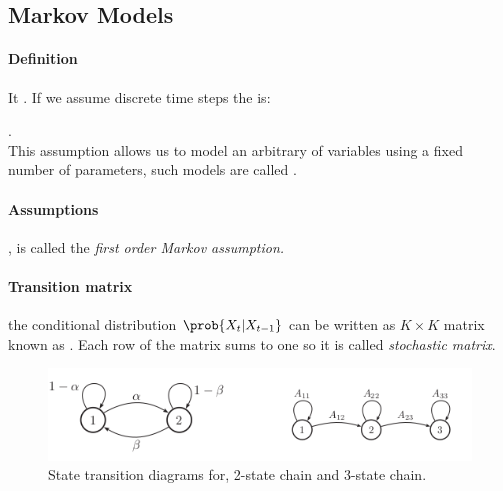 \subsection{Markov Models}
\paragraph{Definition}
It .
If we assume discrete time steps the  is:
\begin{center}
\end{center}
.\\
This assumption allows us to model an arbitrary of variables using a fixed number of parameters, such
models are called .
\paragraph{Assumptions}
, is called the \emph{first order Markov assumption.}

\paragraph{Transition matrix}
 the conditional distribution $\prob{X_{t}|X_{t-1}}$ can be written as 
$K\times K$ matrix known as . Each row of the matrix sums to one
 so it is called \emph{stochastic matrix}.
\begin{figure}[H]
    \begin{center}
        \includegraphics[width=.5\textwidth]{./chapters/2_statistics/07_hidden_markov_models/1_images/1_state_transition_diagrams.png}
    \end{center}
    \caption{State transition diagrams for, 2-state chain and 3-state chain.}
    \label{fig:1_state_transition_diagrams}
\end{figure}

